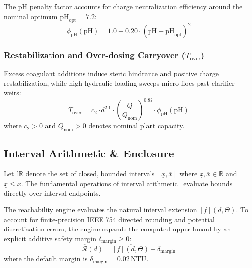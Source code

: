 \documentclass[10pt,twocolumn,letterpaper]{article}
\theoremstyle{definition}
\newcommand{\IR}{\mathbb{IR}}
\newcommand{\R}{\mathbb{R}}
\newcommand{\Tover}{T_{\text{over}}}
\newcommand{\Qnom}{Q_{\text{nom}}}
\newcommand{\pHopt}{\text{pH}_{\text{opt}}}
\newcommand{\phipH}{\phi_{\text{pH}}}
\newcommand{\Rbar}{\overline{\mathcal{R}}}
\begin{document}
The pH penalty factor accounts for charge neutralization efficiency around the nominal optimum $\pHopt = 7.2$:
\begin{equation}
\phipH(\text{pH}) = 1.0 + 0.20 \cdot (\text{pH} - \pHopt)^2
\end{equation}

\subsubsection{Restabilization and Over-dosing Carryover ($\Tover$)}
Excess coagulant additions induce steric hindrance and positive charge restabilization, while high hydraulic loading sweeps micro-flocs past clarifier weirs:
\begin{equation}
\Tover = c_2 \cdot d^{2.1} \cdot \left(\frac{Q}{\Qnom}\right)^{0.85} \cdot \phipH(\text{pH})
\end{equation}
where $c_2 > 0$ and $\Qnom > 0$ denotes nominal plant capacity.

\subsection{Interval Arithmetic \& Enclosure}
Let $\IR$ denote the set of closed, bounded intervals $[\underline{x}, \overline{x}]$ where $\underline{x}, \overline{x} \in \R$ and $\underline{x} \le \overline{x}$. The fundamental operations of interval arithmetic~\cite{moore1966interval} evaluate bounds directly over interval endpoints.

The reachability engine evaluates the natural interval extension $[f](d, \Theta)$. To account for finite-precision IEEE 754 directed rounding and potential discretization errors, the engine expands the computed upper bound by an explicit additive safety margin $\delta_{\text{margin}} \ge 0$:
\begin{equation}
\Rbar(d) = \overline{[f](d, \Theta)} + \delta_{\text{margin}}
\end{equation}
where the default margin is $\delta_{\text{margin}} = 0.02\,\text{NTU}$.
\end{document}
